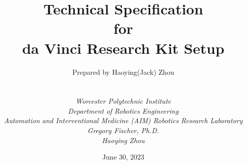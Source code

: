 
\def\Company{Consultancy}
\def\Institute{\textit{Worcester Polytechnic Institute}}
\def\Course{\textit{Department of Robotics Engineering}}
\def\Module{\textit{Automation and Interventional Medicine (AIM) Robotics Research Laboratory}}
\def\Docent{\textit{Gregory Fischer, Ph.D.}}
\def\Assistant{\textit{Haoying Zhou}}

\def\BoldTitle{Technical Specification}

\def\Subtitle{for \\ da Vinci Research Kit Setup \\}
\def\Authors{Prepared by Haoying(Jack) Zhou } 
\def\Shortname{Jack}


\title{\textbf{\BoldTitle}\\\Subtitle}
\author{\Authors \\ \\ \\ \Institute\\ \Course\\ \Module\\ \Docent\\ \Assistant}
\date{June 30, 2023}

